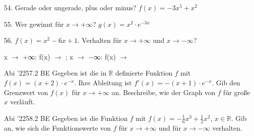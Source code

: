 \documentclass[11pt]{article}
\begin{document}
\begin{pfaufg}{}{54.}{}
Gerade oder ungerade, plus oder minus? $f(x) = -3x^5 + x^2$
\end{pfaufg}
\begin{pfaufg}{}{55.}{}
Wer gewinnt für $x \to +\infty$? $g(x) = x^2 \cdot e^{-3x}$
\end{pfaufg}
\pfgruppe{}
\begin{pfaufg}{}{56.}{}
$f(x) = x^2 - 6x + 1$. Verhalten für $x \to +\infty$ und $x \to -\infty$?
\par\noindent x $\to$ +∞: f(x) $\to$ \leerfeld ; x $\to$ $-$∞: f(x) $\to$ \leerfeld \par
{}
\end{pfaufg}
\pfgruppe{}
\begin{pfaufg}{Abi ’22}{57.}{2 BE}
Gegeben ist die in $\mathbb{R}$ definierte Funktion $f$ mit $f(x) = (x + 2)\cdot e^{-x}$. Ihre Ableitung ist $f'(x) = -(x + 1)\cdot e^{-x}$. Gib den Grenzwert von $f(x)$ für $x \to +\infty$ an. Beschreibe, wie der Graph von $f$ für große $x$ verläuft.
\end{pfaufg}
\begin{pfaufg}{Abi ’22}{58.}{2 BE}
Gegeben ist die Funktion $f$ mit $f(x) = -\tfrac{1}{6}x^3 + \tfrac{1}{2}x^2$, $x \in \mathbb{R}$. Gib an, wie sich die Funktionswerte von $f$ für $x \to +\infty$ und für $x \to -\infty$ verhalten.
\end{pfaufg}
\end{document}
